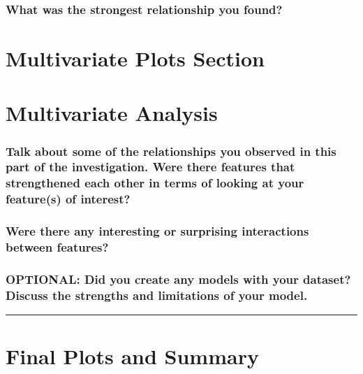 \documentclass[]{article}
\begin{document}
\subsubsection{What was the strongest relationship you
found?}\label{what-was-the-strongest-relationship-you-found}

\section{Multivariate Plots Section}\label{multivariate-plots-section}

\section{Multivariate Analysis}\label{multivariate-analysis}

\subsubsection{Talk about some of the relationships you observed in this
part of the investigation. Were there features that strengthened each
other in terms of looking at your feature(s) of
interest?}\label{talk-about-some-of-the-relationships-you-observed-in-this-part-of-the-investigation.-were-there-features-that-strengthened-each-other-in-terms-of-looking-at-your-features-of-interest}

\subsubsection{Were there any interesting or surprising interactions
between
features?}\label{were-there-any-interesting-or-surprising-interactions-between-features}

\subsubsection{OPTIONAL: Did you create any models with your dataset?
Discuss the strengths and limitations of your
model.}\label{optional-did-you-create-any-models-with-your-dataset-discuss-the-strengths-and-limitations-of-your-model.}

\begin{center}\rule{0.5\linewidth}{\linethickness}\end{center}

\section{Final Plots and Summary}\label{final-plots-and-summary}
\end{document}

